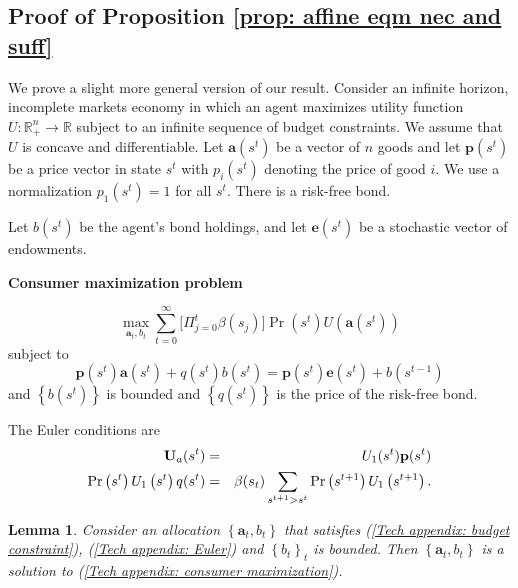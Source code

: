 \documentclass[thmsb,11pt]{article}
\newtheorem{lemma}{Lemma}
\begin{document}
{\smallskip
\subsection{\smallskip Proof of Proposition  \ref{prop: affine eqm nec and suff}}
\label{appndx: affine eqm nec and stuff}
\smallskip

We prove a slight more general version of our result. Consider an infinite
horizon, incomplete markets economy in which an agent maximizes utility
function $U:\mathbb{R}_{+}^{n}\rightarrow \mathbb{R}$ subject to an infinite
sequence of budget constraints. We assume that $U$ is concave and
differentiable. Let $\mathbf{a}(s^t)$ be a vector of $n$ goods and let $%
\mathbf{p}(s^{t})$ be a price vector in state $s^{t}$ with $p_{i}(s^{t})$
denoting the price of good $i.$ We use a normalization $p_{1}\left(
s^{t}\right) =1$ for all $s^{t}.$ There is a risk-free bond.

Let $b(s^{t})$ be the agent's bond holdings, and let $\mathbf{e}\left(
s^{t}\right) $ be a stochastic vector of endowments.

\textbf{Consumer maximization problem}


\begin{equation}
\max_{\mathbf{a}_{t},b_{t}}\sum_{t=0}^{\infty }\bigl[\Pi_{j=0}^t \beta(s_j)\bigr]\Pr \left(
s^{t}\right) U(\mathbf{a}\left( s^{t}\right) )
\label{Tech appendix: consumer maximization}
\end{equation}%
subject to%
\begin{equation}
\mathbf{p}\left( s^{t}\right) \mathbf{a}\left( s^{t}\right) +q(s^{t})b\left(
s^{t}\right) =\mathbf{p}\left( s^{t}\right) \mathbf{e}\left( s^{t}\right)
+b\left( s^{t-1}\right)  \label{Tech appendix: budget constraint}
\end{equation}%
and $\left \{ b\left( s^{t}\right) \right \} $ is bounded and $\left \{
q(s^{t})\right \} $ is the price of the risk-free bond.

The Euler conditions are%
\begin{eqnarray}
\mathbf{U}_{a}(s^{t}) &=&U_{1}(s^{t})\mathbf{p}(s^{t})
\label{Tech appendix: Euler} \\
\Pr \left( s^{t}\right) U_{1}\left( s^{t}\right) q(s^{t}) &=&\beta(s_t)
\sum_{s^{t+1}>s^{t}}\Pr \left( s^{t+1}\right) U_{1}\left( s^{t+1}\right) .
\notag
\end{eqnarray}

\begin{lemma}
\smallskip Consider an allocation $\left \{ \mathbf{a}_{t},b_{t}\right \} $
that satisfies (\ref{Tech appendix: budget constraint}), (\ref{Tech
appendix: Euler}) and $\left \{ b_{t}\right \} _{t}$ is bounded. Then $%
\left
\{ \mathbf{a}_{t},b_{t}\right \} $ is a solution to (\ref{Tech
appendix: consumer maximization}).
\end{lemma}

}
\end{document}
